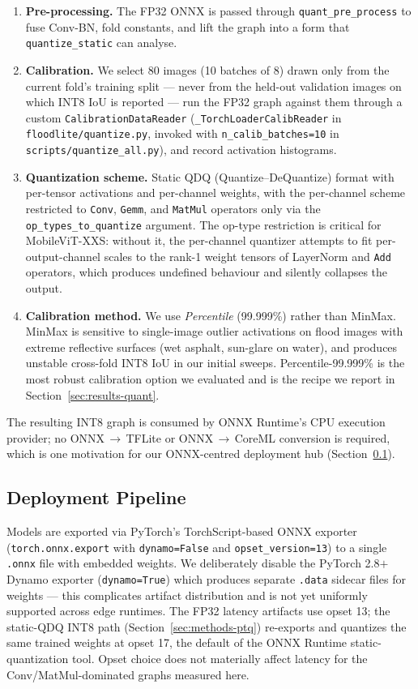 \begin{enumerate}
\item \textbf{Pre-processing.} The FP32 ONNX is passed through \texttt{quant\_pre\_process} to fuse Conv-BN, fold constants, and lift the graph into a form that \texttt{quantize\_static} can analyse.
\item \textbf{Calibration.} We select 80 images (10 batches of 8) drawn only from the current fold's training split --- never from the held-out validation images on which INT8 IoU is reported --- run the FP32 graph against them through a custom \texttt{CalibrationDataReader} (\texttt{\_TorchLoaderCalibReader} in \texttt{floodlite/quantize.py}, invoked with \texttt{n\_calib\_batches=10} in \texttt{scripts/quantize\_all.py}), and record activation histograms.
\item \textbf{Quantization scheme.} Static QDQ (Quantize--DeQuantize) format with per-tensor activations and per-channel weights, with the per-channel scheme restricted to \texttt{Conv}, \texttt{Gemm}, and \texttt{MatMul} operators only via the \texttt{op\_types\_to\_quantize} argument. The op-type restriction is critical for MobileViT-XXS: without it, the per-channel quantizer attempts to fit per-output-channel scales to the rank-1 weight tensors of LayerNorm and \texttt{Add} operators, which produces undefined behaviour and silently collapses the output.
\item \textbf{Calibration method.} We use \emph{Percentile} (99.999\%) rather than MinMax. MinMax is sensitive to single-image outlier activations on flood images with extreme reflective surfaces (wet asphalt, sun-glare on water), and produces unstable cross-fold INT8 IoU in our initial sweeps. Percentile-99.999\% is the most robust calibration option we evaluated and is the recipe we report in Section~\ref{sec:results-quant}.
\end{enumerate}

The resulting INT8 graph is consumed by ONNX Runtime's CPU execution provider; no ONNX\,$\rightarrow$\,TFLite or ONNX\,$\rightarrow$\,CoreML conversion is required, which is one motivation for our ONNX-centred deployment hub (Section~\ref{sec:methods-deploy}).

\subsection{Deployment Pipeline}
\label{sec:methods-deploy}

Models are exported via PyTorch's TorchScript-based ONNX exporter (\texttt{torch.onnx.export} with \texttt{dynamo=False} and \texttt{opset\_version=13}) to a single \texttt{.onnx} file with embedded weights. We deliberately disable the PyTorch 2.8$+$ Dynamo exporter (\texttt{dynamo=True}) which produces separate \texttt{.data} sidecar files for weights --- this complicates artifact distribution and is not yet uniformly supported across edge runtimes. The FP32 latency artifacts use opset 13; the static-QDQ INT8 path (Section~\ref{sec:methods-ptq}) re-exports and quantizes the same trained weights at opset 17, the default of the ONNX Runtime static-quantization tool. Opset choice does not materially affect latency for the Conv/MatMul-dominated graphs measured here.

